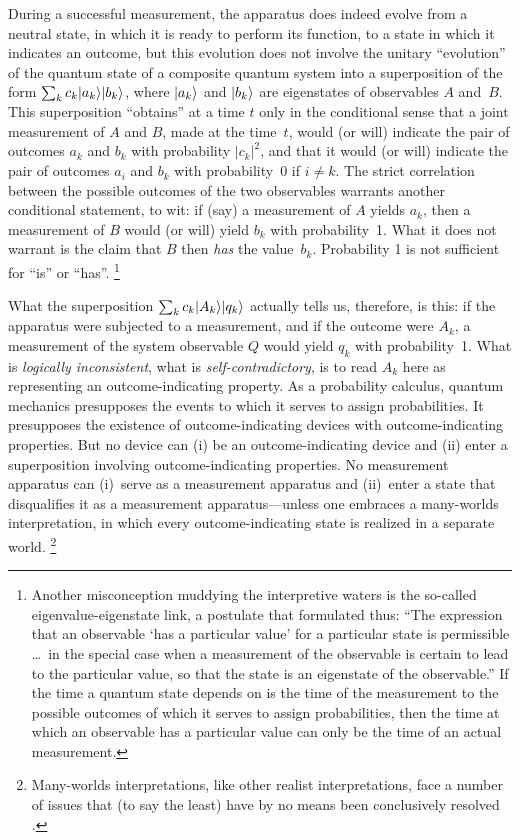 During a successful measurement, the apparatus does indeed evolve from a neutral state, in which it is ready to perform its function, to a state in which it indicates an outcome, but this evolution does not involve the unitary ``evolution'' of the quantum state of a composite quantum system into a superposition of the form $\sum_k c_k|a_k\rangle|b_k\rangle$, where $|a_k\rangle$ and $|b_k\rangle$ are eigenstates of observables $A$ and~$B$. This superposition ``obtains'' at a time $t$ only in the conditional sense that a joint measurement of $A$ and $B$, made at the time~$t$, would (or will) indicate the pair of outcomes $a_k$ and $b_k$ with probability $|c_k|^2$, and that it would (or will) indicate the pair of outcomes $a_i$ and $b_k$ with probability~0 if $i\neq k$. The strict correlation between the possible outcomes of the two observables warrants another conditional statement, to wit: if (say) a measurement of $A$ yields $a_k$, then a measurement of $B$ would (or will) yield $b_k$ with probability~1. What it does not warrant is the claim that $B$ then \emph{has} the value~$b_k$. Probability 1 is not sufficient for ``is'' or ``has''.%
\footnote{Another misconception muddying the interpretive waters is the so-called eigenvalue-eigenstate link, a postulate that \citet[pp.~46--47]{Dirac} formulated thus: ``The expression that an observable `has a particular value' for a particular state is permissible \dots\ in the special case when a measurement of the observable is certain to lead to the particular value, so that the state is an eigenstate of the observable.'' If the time a quantum state depends on is the time of the measurement to the possible outcomes of which it serves to assign probabilities, then the time at which an observable has a particular value can only be the time of an actual measurement.}

What the superposition $\sum_{k}c_k|A_k\rangle|q_k\rangle$ actually tells us, therefore, is this: if the apparatus were subjected to a measurement, and if the outcome were $A_k$, a measurement of the system observable $Q$ would yield $q_k$ with probability~1. What is \emph{logically inconsistent}, what is \emph{self-contradictory}, is to read $A_k$ here as representing an outcome-indicating property. As a probability calculus, quantum mechanics presupposes the events to which it serves to assign probabilities. It presupposes the existence of outcome-indicating devices with outcome-indicating properties. But no device can (i) be an outcome-indicating device and (ii) enter a superposition involving outcome-indicating properties. No measurement apparatus can (i)~serve as a measurement apparatus and (ii)~enter a state that disqualifies it as a measurement apparatus---unless one embraces a many-worlds interpretation, in which every outcome-indicating state is realized in a separate world.%
\footnote{Many-worlds interpretations, like other realist interpretations, face a number of issues that (to say the least) have by no means been conclusively resolved \citep{Barrett,Marchil2015}.}

